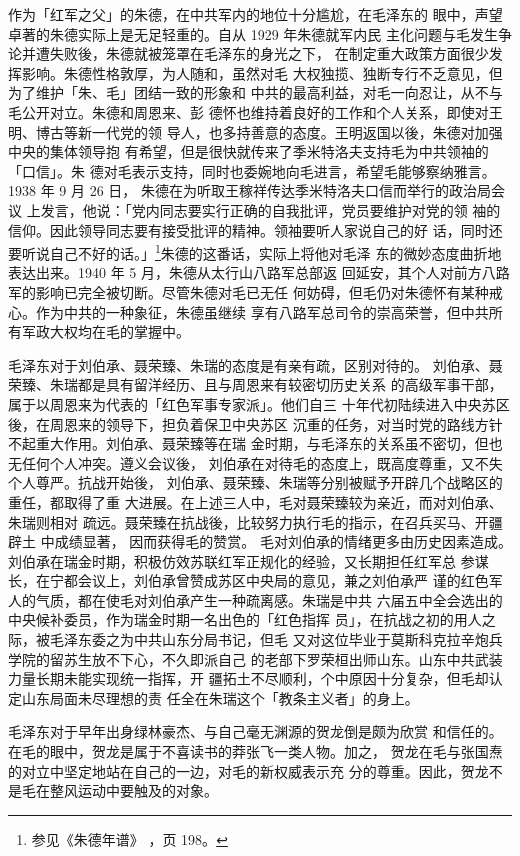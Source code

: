 作为「红军之父」的朱德，在中共军内的地位十分尴尬，在毛泽东的
眼中，声望卓著的朱德实际上是无足轻重的。自从 1929 年朱德就军内民
主化问题与毛发生争论并遭失败後，朱德就被笼罩在毛泽东的身光之下，
在制定重大政策方面很少发挥影响。朱德性格敦厚，为人随和，虽然对毛
大权独揽、独断专行不乏意见，但为了维护「朱、毛」团结一致的形象和
中共的最高利益，对毛一向忍让，从不与毛公开对立。朱德和周恩来、彭
德怀也维持着良好的工作和个人关系，即使对王明、博古等新一代党的领
导人，也多持善意的态度。王明返国以後，朱德对加强中央的集体领导抱
有希望，但是很快就传来了季米特洛夫支持毛为中共领袖的「口信」。朱
德对毛表示支持，同时也委婉地向毛进言，希望毛能够察纳雅言。1938 年
9 月 26 日，
朱德在为听取王稼祥传达季米特洛夫口信而举行的政治局会议
上发言，他说：「党内同志要实行正确的自我批评，党员要维护对党的领
袖的信仰。因此领导同志要有接受批评的精神。领袖要听人家说自己的好
话，同时还要听说自己不好的话。」\footnote{参见《朱德年谱》
，页 198。}朱德的这番话，实际上将他对毛泽
东的微妙态度曲折地表达出来。1940 年 5 月，朱德从太行山八路军总部返
回延安，其个人对前方八路军的影响已完全被切断。尽管朱德对毛已无任
何妨碍，但毛仍对朱德怀有某种戒心。作为中共的一种象征，朱德虽继续
享有八路军总司令的崇高荣誉，但中共所有军政大权均在毛的掌握中。

毛泽东对于刘伯承、聂荣臻、朱瑞的态度是有亲有疏，区别对待的。
刘伯承、聂荣臻、朱瑞都是具有留洋经历、且与周恩来有较密切历史关系
的高级军事干部，属于以周恩来为代表的「红色军事专家派」。他们自三
十年代初陆续进入中央苏区後，在周恩来的领导下，担负着保卫中央苏区
沉重的任务，对当时党的路线方针不起重大作用。刘伯承、聂荣臻等在瑞
金时期，与毛泽东的关系虽不密切，但也无任何个人冲突。遵义会议後，
刘伯承在对待毛的态度上，既高度尊重，又不失个人尊严。抗战开始後，
刘伯承、聂荣臻、朱瑞等分别被赋予开辟几个战略区的重任，都取得了重
大进展。在上述三人中，毛对聂荣臻较为亲近，而对刘伯承、朱瑞则相对
疏远。聂荣臻在抗战後，比较努力执行毛的指示，在召兵买马、开疆辟土
中成绩显著，
因而获得毛的赞赏。
毛对刘伯承的情绪更多由历史因素造成。
刘伯承在瑞金时期，积极仿效苏联红军正规化的经验，又长期担任红军总
参谋长，在宁都会议上，刘伯承曾赞成苏区中央局的意见，兼之刘伯承严
谨的红色军人的气质，都在使毛对刘伯承产生一种疏离感。朱瑞是中共
六届五中全会选出的中央候补委员，作为瑞金时期一名出色的「红色指挥
员」，在抗战之初的用人之际，被毛泽东委之为中共山东分局书记，但毛
又对这位毕业于莫斯科克拉辛炮兵学院的留苏生放不下心，不久即派自己
的老部下罗荣桓出师山东。山东中共武装力量长期未能实现统一指挥，开
疆拓土不尽顺利，个中原因十分复杂，但毛却认定山东局面未尽理想的责
任全在朱瑞这个「教条主义者」的身上。

毛泽东对于早年出身绿林豪杰、与自己毫无渊源的贺龙倒是颇为欣赏
和信任的。在毛的眼中，贺龙是属于不喜读书的莽张飞一类人物。加之，
贺龙在毛与张国焘的对立中坚定地站在自己的一边，对毛的新权威表示充
分的尊重。因此，贺龙不是毛在整风运动中要触及的对象。

